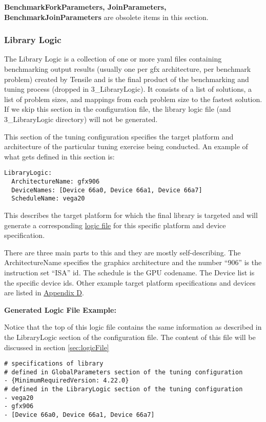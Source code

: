 \documentclass[]{article}
\begin{document}
\textbf{BenchmarkForkParameters, JoinParameters, BenchmarkJoinParameters} are obsolete items in this section.


\subsubsection{Library Logic}
\label{sec:LibraryLogic}

The Library Logic is a collection of one or more yaml files containing benchmarking output results (usually one per gfx architecture, per benchmark problem) created by Tensile and is the final product of the benchmarking and tuning process (dropped in 3\_LibraryLogic). It consists of a list of solutions, a list of problem sizes, and mappings from each problem size to the fastest solution. If we skip this section in the configuration file, the library logic file (and 3\_LibraryLogic directory) will not be generated.

This section of the tuning configuration specifies the target platform and architecture of the particular tuning exercise being conducted. An example of what gets defined in this section is:

\begin{verbatim}
LibraryLogic:
  ArchitectureName: gfx906
  DeviceNames: [Device 66a0, Device 66a1, Device 66a7]
  ScheduleName: vega20
\end{verbatim}
\noindent
This describes the target platform for which the final library is targeted and will generate a corresponding \hyperref[sec:logicFile]{logic file} for this specific platform and device specification. \newline

\noindent
There are three main parts to this and they are mostly self-describing. The ArchitectureName specifies the graphics architecture and the number ``906'' is the instruction set ``ISA'' id. The schedule is the GPU codename. The Device list is the specific device ids. Other example target platform specifications and devices are listed in \hyperref[sec:appendixD]{Appendix D}. \newline


\noindent \textbf{Generated Logic File Example:}

\noindent
Notice that the top of this logic file contains the same information as described in the LibraryLogic section of the configuration file. The content of this file will be discussed in section \ref{sec:logicFile} \newline
\begin{verbatim}
# specifications of library
# defined in GlobalParameters section of the tuning configuration
- {MinimumRequiredVersion: 4.22.0}
# defined in the LibraryLogic section of the tuning configuration
- vega20
- gfx906
- [Device 66a0, Device 66a1, Device 66a7]
\end{verbatim}
\end{document}
